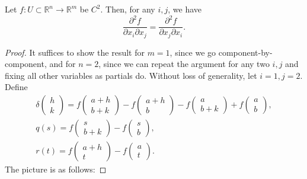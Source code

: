 \documentclass[12pt]{article}
\begin{document}
\begin{theorem}
	Let $f:U\subset\mathbb{R}^n \to\mathbb{R}^m$ be $C^2$. Then, for any $i,j$, we have 
	\begin{equation*}
		\frac{\partial^2 f}{\partial x_i\partial x_j} = \frac{\partial^2 f}{\partial x_j \partial x_i}.
	\end{equation*}
\end{theorem}
\begin{proof} 
	It suffices to show the result for $m=1$, since we go component-by-component, and for $n=2$, since we can repeat the argument for any two $i,j$ and fixing all other variables as partials do. Without loss of generality, let $i=1, j=2$. Define 
	\begin{gather*}
		\delta\begin{pmatrix} h \\ k \end{pmatrix} = f\begin{pmatrix}a+h \\ b+k \end{pmatrix} - f\begin{pmatrix}a+h \\ b\end{pmatrix} - f\begin{pmatrix} a\\ b+k \end{pmatrix} + f\begin{pmatrix} a \\ b\end{pmatrix}, \\
		q(s) = f\begin{pmatrix}s \\ b+k\end{pmatrix} - f\begin{pmatrix}s \\ b\end{pmatrix}, \\
		r(t) = f\begin{pmatrix} a+h \\ t\end{pmatrix} - f\begin{pmatrix}a \\ t\end{pmatrix}.
	\end{gather*}
	The picture is as follows:


\end{proof}
\end{document}
